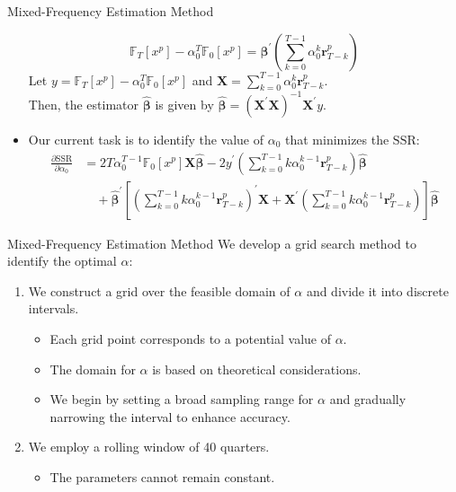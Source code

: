 \documentclass[UTF8, 10pt]{beamer}
\begin{document}
\begin{CJK*}{UTF8}{gbsn}
\begin{frame}{Mixed-Frequency Estimation Method}
\begin{itemize}
			$$
			\mathbb{F}_{T}\left[x^p\right]
		    - \alpha_0^T \mathbb{F}_{0}\left[x^p\right]
		    = \boldsymbol{\beta}^{\prime} (\sum_{k=0}^{T-1} \alpha_0^k \mathbf{r}_{T-k}^p)
			$$
			Let $y=\mathbb{F}_{T}\left[x^p\right] - \alpha_0^T \mathbb{F}_{0}\left[x^p\right]$ and $\mathbf{X}=\sum_{k=0}^{T-1} \alpha_0^k \mathbf{r}_{T-k}^p$.
			\\
			Then, the estimator $\hat{\boldsymbol{\beta}}$ is given by $\hat{\boldsymbol{\beta}}=(\mathbf{X}^\prime \mathbf{X})^{-1}\mathbf{X}^\prime y$.
		\item Our current task is to identify the value of $\alpha_0$ that \alert{minimizes the $\mathrm{SSR}$}:
			$$
			\begin{aligned}
		        \frac{\partial \mathrm{SSR}}{\partial \alpha_{0}}
		        &= 2 T \alpha_{0}^{T-1} \mathbb{F}_{0}\left[x^{p}\right] \mathbf{X} \hat{\boldsymbol{\beta}}
		        - 2 y^{\prime}\left(\sum_{k=0}^{T-1} k \alpha_{0}^{k-1} \mathbf{r}_{T-k}^{p}\right) \hat{\boldsymbol{\beta}}
		        \\
		        & \quad + \hat{\boldsymbol{\beta}}^{\prime}\left[\left(\sum_{k=0}^{T-1} k \alpha_{0}^{k-1} \mathbf{r}_{T-k}^{p}\right)^{\prime} \mathbf{X}
		        +\mathbf{X}^{\prime}\left(\sum_{k=0}^{T-1} k \alpha_{0}^{k-1} \mathbf{r}_{T-k}^{p}\right)\right] \hat{\boldsymbol{\beta}}
		    \end{aligned}
			$$
	\end{itemize}
\end{frame}
\begin{frame}{Mixed-Frequency Estimation Method}
	We develop a \alert{grid search method} to identify the optimal $\alpha$:
	\begin{enumerate}
		\item We construct a grid over the \alert{feasible domain} of $\alpha$ and divide it into discrete intervals.
			\begin{itemize}
				\item Each grid point corresponds to a potential value of $\alpha$.
				\item The domain for $\alpha$ is based on theoretical considerations.
				\item We begin by setting a broad sampling range for $\alpha$ and gradually narrowing the interval to enhance accuracy.
			\end{itemize}
		\item We employ a \alert{rolling window} of 40 quarters.
			\begin{itemize}
				\item The parameters cannot remain constant.

\end{itemize}
\end{enumerate}
\end{frame}
\end{CJK*}
\end{document}

